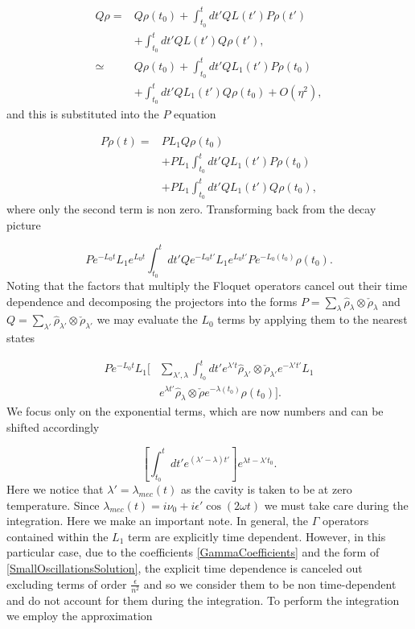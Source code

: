 \documentclass[reprint, amsmath,amssymb, aps,pra]{revtex4-1}
\begin{document}
\begin{align*}
Q\rho =& Q\rho(t_0) + \int_{t_0}^{t}dt' QL(t')P\rho(t')\\
       &+\int_{t_0}^{t}dt'QL(t')Q\rho(t'),\\
\simeq & Q\rho(t_0) + \int_{t_0}^{t}dt' QL_1(t')P\rho(t_0)\\
       &+\int_{t_0}^{t}dt'QL_1(t')Q\rho(t_0)+O(\eta^2),
\end{align*} and this is substituted into the $P$ equation

\begin{align}
P\dot{\rho}(t) =& PL_1Q\rho(t_0)\\ 
 &+ PL_1\int_{t_0}^{t}dt' QL_1(t')P\rho(t_0)\nonumber \\
 &+ PL_1\int_{t_0}^{t}dt'QL_1(t')Q\rho(t_0) \nonumber,
\end{align} where only the second term is non zero. Transforming back from the decay picture

\begin{equation}
P e^{-L_0 t}L_1e^{L_0 t}\int_{t_0}^{t}dt'Qe^{-L_0 t'}L_1e^{L_0 t'}Pe^{-L_0(t_0)}\rho(t_0).
\end{equation} Noting that the factors that multiply the Floquet operators cancel out their time dependence and decomposing the projectors into the forms $P=\sum_\lambda \hat{\rho}_\lambda \otimes \check{\rho}_\lambda$ and $Q=\sum_{\lambda'} \hat{\rho}_{\lambda'} \otimes \check{\rho}_{\lambda'}$ we may evaluate the $L_0$ terms by applying them to the nearest states

\begin{align}\label{ProyectionEQ}
P e^{-L_0 t}L_1[&\sum_{\lambda',\lambda}\int_{t_0}^{t}dt'e^{\lambda' t} \hat{\rho}_{\lambda'} \otimes \check{\rho}_{\lambda'}e^{-\lambda' t'}L_1\\
&e^{\lambda t'}\hat{\rho}_\lambda \otimes \check{\rho}e^{-\lambda( t_0)}\rho(t_0)]\nonumber.
\end{align} We focus only on the exponential terms, which are now numbers and can be shifted accordingly

\begin{equation}\label{LambdaExponentials}
[\int_{t_0}^t dt' e^{(\lambda'-\lambda)t'}]e^{\lambda t- \lambda't_0}.
\end{equation} Here we notice that $\lambda' = \lambda_{mec}(t)$ as the cavity is taken to be at zero temperature. Since $\lambda_{mec}(t) = i\nu_0 + i\epsilon' \cos(2\omega t)$ we must take care during the integration. Here we make an important note. In general, the $\Gamma$ operators contained within the $L_1$ term are explicitly time dependent. However, in this particular case, due to the coefficients \eqref{GammaCoefficients} and the form of \eqref{SmallOscillationsSolution}, the explicit time dependence is canceled out excluding terms of order $\frac{\epsilon}{n^2}$ and so we consider them to be non time-dependent and do not account for them during the integration. To perform the integration we employ the approximation
\end{document}
